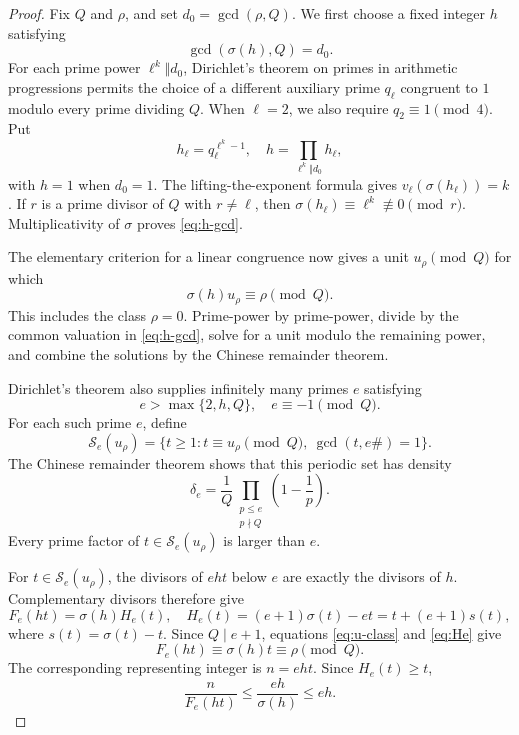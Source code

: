 \documentclass[11pt,letterpaper,reqno]{amsart}
\numberwithin{equation}{section}
\theoremstyle{remark}
\newcommand{\1}{\mathbf 1}
\renewcommand{\leq}{\leqslant}
\renewcommand{\geq}{\geqslant}
\begin{document}
\begin{proof}
Fix $Q$ and $\rho$, and set $d_0=\gcd(\rho,Q)$. We first choose a fixed
integer $h$ satisfying
\begin{equation}\label{eq:h-gcd}
 \gcd(\sigma(h),Q)=d_0.
\end{equation}
For each prime power $\ell^k\Vert d_0$, Dirichlet's theorem on primes in
arithmetic progressions permits the choice of a different auxiliary prime
$q_\ell$ congruent to $1$ modulo every prime dividing $Q$. When $\ell=2$,
we also require $q_2\equiv1\pmod4$. Put
\[
 h_\ell=q_\ell^{\ell^k-1},\quad
 h=\prod_{\ell^k\Vert d_0}h_\ell,
\]
with $h=1$ when $d_0=1$. The lifting-the-exponent formula gives
$v_\ell(\sigma(h_\ell))=k$. If $r$ is a prime divisor of $Q$ with $r\ne\ell$, then
$\sigma(h_\ell)\equiv\ell^k\not\equiv0\pmod r$. Multiplicativity of
$\sigma$ proves \eqref{eq:h-gcd}.

The elementary criterion for a linear congruence now gives a unit
$u_\rho\pmod Q$ for which
\begin{equation}\label{eq:u-class}
 \sigma(h)u_\rho\equiv\rho\pmod Q.
\end{equation}
This includes the class $\rho=0$. Prime-power by prime-power, divide by the
common valuation in \eqref{eq:h-gcd}, solve for a unit modulo the remaining
power, and combine the solutions by the Chinese remainder theorem.

Dirichlet's theorem also supplies infinitely many primes $e$ satisfying
\[
 e>\max\{2,h,Q\},\quad e\equiv-1\pmod Q.
\]
For each such prime $e$, define
\[
 \mathcal{S}_e(u_\rho)=\{t\geq1:t\equiv u_\rho\pmod Q,\
 \gcd(t,e\#)=1\}.
\]
The Chinese remainder theorem shows that this periodic set has density
\[
 \delta_e=\frac1Q
 \prod_{\substack{p\leq e\\p\nmid Q}}\left(1-\frac1p\right).
\]
Every prime factor of $t\in\mathcal{S}_e(u_\rho)$ is larger than $e$.

For $t\in\mathcal{S}_e(u_\rho)$, the divisors of $eht$ below $e$ are exactly
the divisors of $h$. Complementary divisors therefore give
\begin{equation}\label{eq:He}
 F_e(ht)=\sigma(h)H_e(t),
 \quad H_e(t)=(e+1)\sigma(t)-et=t+(e+1)s(t),
\end{equation}
where $s(t)=\sigma(t)-t$. Since $Q\mid e+1$, equations
\eqref{eq:u-class} and \eqref{eq:He} give
\[
 F_e(ht)\equiv\sigma(h)t\equiv\rho\pmod Q.
\]
The corresponding representing integer is $n=eht$. Since $H_e(t)\geq t$,
\begin{equation}\label{eq:representing-ratio}
 \frac{n}{F_e(ht)}\leq\frac{eh}{\sigma(h)}\leq eh.
\end{equation}


\end{proof}
\end{document}
